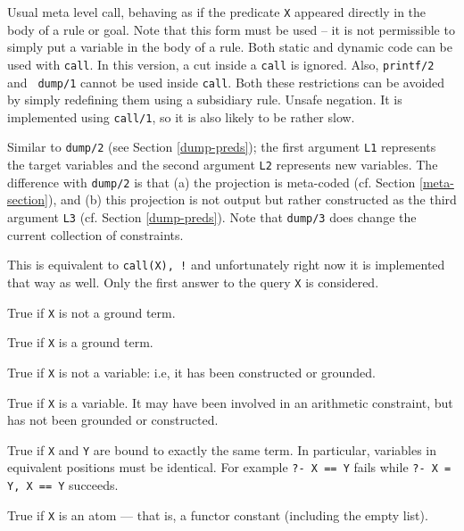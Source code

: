 \begin{description}

Usual meta level call, behaving as if the predicate {\tt X} appeared
directly in the body of a rule or goal.
Note that this form must be used -- it is not
permissible to simply put a variable in the body of a rule. 
Both static and dynamic code can be used with {\tt call}.
In this version, a cut inside a {\tt call} is ignored.
Also, {\tt printf/2} and {\tt
dump/1} cannot be used inside {\tt call}.
Both these restrictions can be avoided by simply redefining them using
a subsidiary rule.
Unsafe negation. It is implemented using {\tt call/1}, so it is also likely to
be rather slow.

Similar to {\tt dump/2} (see Section \ref{dump-preds}); 
the first argument {\tt L1} represents
the target variables and the second argument {\tt L2} represents
new variables.  The difference with {\tt dump/2} is that (a) the 
projection is meta-coded (cf. Section \ref{meta-section}), and 
(b) this projection is not output but rather constructed as
the third argument {\tt L3} (cf. Section
\ref{dump-preds}).
Note that {\tt dump/3} does change the current collection
of constraints.

This is equivalent to {\tt call(X), !} and unfortunately right now it is
implemented that way as well. Only the first answer to the query {\tt X} is
considered.

True if {\tt X} is not a ground term.

True if {\tt X} is a ground term.

True if {\tt X} is not a variable: i.e, it has been constructed or grounded.

True if {\tt X} is a variable. It may have been involved in an arithmetic
constraint, but has not been grounded or constructed.

True if {\tt X} and {\tt Y} are bound to exactly the same term.  In
particular, variables in equivalent positions must be identical. 
For example {\tt ?- X == Y} fails while {\tt ?- X = Y, X == Y}
succeeds.

True if {\tt X} is an atom --- that is, a functor constant (including
the empty list).


\end{description}

